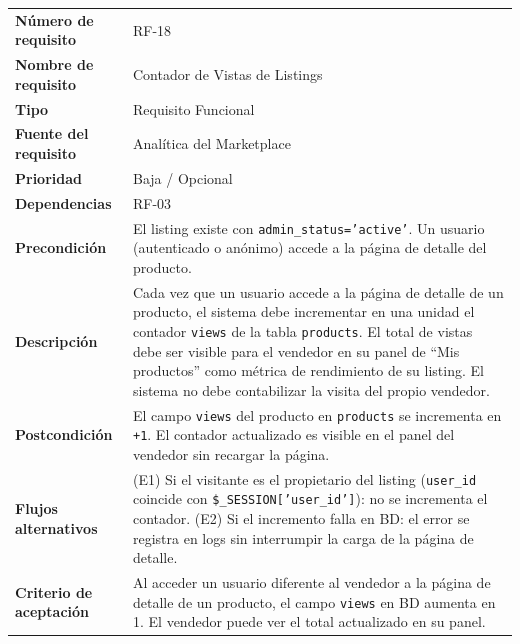 \documentclass[11pt,a4paper]{report}
\begin{document}
\begin{table}[H]
\centering
\begin{tabularx}{\textwidth}{|l|L|}
\hline
{} \\ \hline
\textbf{Número de requisito} & RF-18 \\ \hline
\textbf{Nombre de requisito} & Contador de Vistas de Listings \\ \hline
\textbf{Tipo} & Requisito Funcional \\ \hline
\textbf{Fuente del requisito} & Analítica del Marketplace \\ \hline
\textbf{Prioridad} & Baja / Opcional \\ \hline
\textbf{Dependencias} & RF-03 \\ \hline
\textbf{Precondición} & El listing existe con \texttt{admin\_status='active'}. Un usuario (autenticado o anónimo) accede a la página de detalle del producto. \\ \hline
\textbf{Descripción} & Cada vez que un usuario accede a la página de detalle de un producto, el sistema debe incrementar en una unidad el contador \texttt{views} de la tabla \texttt{products}. El total de vistas debe ser visible para el vendedor en su panel de ``Mis productos'' como métrica de rendimiento de su listing. El sistema no debe contabilizar la visita del propio vendedor. \\ \hline
\textbf{Postcondición} & El campo \texttt{views} del producto en \texttt{products} se incrementa en \texttt{+1}. El contador actualizado es visible en el panel del vendedor sin recargar la página. \\ \hline
\textbf{Flujos alternativos} & (E1) Si el visitante es el propietario del listing (\texttt{user\_id} coincide con \texttt{\$\_SESSION['user\_id']}): no se incrementa el contador. (E2) Si el incremento falla en BD: el error se registra en logs sin interrumpir la carga de la página de detalle. \\ \hline
\textbf{Criterio de aceptación} & Al acceder un usuario diferente al vendedor a la página de detalle de un producto, el campo \texttt{views} en BD aumenta en 1. El vendedor puede ver el total actualizado en su panel. \\ \hline
\end{tabularx}
\end{table}
\end{document}
